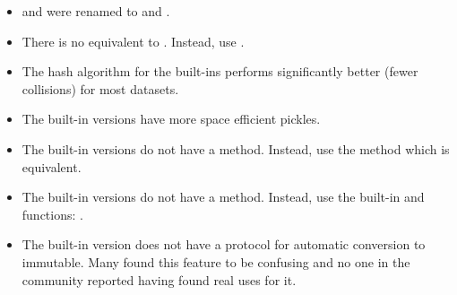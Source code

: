 \begin{itemize}
\item {} and  were renamed to  and
      .
\item There is no equivalent to .  Instead, use
      .
\item The hash algorithm for the built-ins performs significantly better
      (fewer collisions) for most datasets.
\item The built-in versions have more space efficient pickles.
\item The built-in versions do not have a  method.
      Instead, use the  method which is equivalent.
\item The built-in versions do not have a  method.
      Instead, use the built-in  and 
      functions:  .
\item The built-in version does not have a protocol for automatic conversion
      to immutable.  Many found this feature to be confusing and no one
      in the community reported having found real uses for it.
\end{itemize}    
